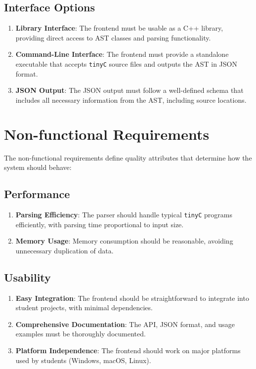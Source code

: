 \subsection{Interface Options}
\begin{enumerate}
    \item \textbf{Library Interface}: The frontend must be usable as a C++ library, providing direct access to AST classes and parsing functionality.
    \item \textbf{Command-Line Interface}: The frontend must provide a standalone executable that accepts \texttt{tinyC} source files and outputs the AST in JSON format.
    \item \textbf{JSON Output}: The JSON output must follow a well-defined schema that includes all necessary information from the AST, including source locations.
\end{enumerate}

\section{Non-functional Requirements}

The non-functional requirements define quality attributes that determine how the system should behave:

\subsection{Performance}
\begin{enumerate}
    \item \textbf{Parsing Efficiency}: The parser should handle typical \texttt{tinyC} programs efficiently, with parsing time proportional to input size.
    \item \textbf{Memory Usage}: Memory consumption should be reasonable, avoiding unnecessary duplication of data.
\end{enumerate}

\subsection{Usability}
\begin{enumerate}
    \item \textbf{Easy Integration}: The frontend should be straightforward to integrate into student projects, with minimal dependencies.
    \item \textbf{Comprehensive Documentation}: The API, JSON format, and usage examples must be thoroughly documented.
    \item \textbf{Platform Independence}: The frontend should work on major platforms used by students (Windows, macOS, Linux).
\end{enumerate}

